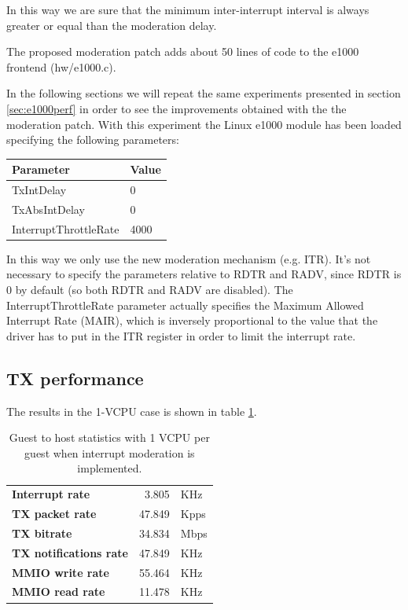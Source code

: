 In this way we are sure that the minimum inter-interrupt interval is always greater or equal than the moderation delay.

\vspace{0.5cm}

The proposed moderation patch adds about 50 lines of code to the e1000 frontend (hw/e1000.c).

\vspace{0.5cm}

In the following sections we will repeat the same experiments presented in section \ref{sec:e1000perf} in order to see the improvements
obtained with the the moderation patch. With this experiment the Linux e1000 module has been loaded specifying the following parameters:
\begin{center}
\begin{tabular}{ll}
\toprule
\textbf{Parameter} & \textbf{Value}\\
\midrule
TxIntDelay & 0\\
TxAbsIntDelay & 0\\
InterruptThrottleRate & 4000\\
\bottomrule
\end{tabular}
\end{center}

In this way we only use the new moderation mechanism (e.g. ITR). It's not necessary to specify the parameters relative to RDTR and
RADV, since RDTR is 0 by default (so both RDTR and RADV are disabled). The InterruptThrottleRate parameter actually specifies the Maximum
Allowed Interrupt Rate (MAIR), which is inversely proportional to the value that the driver has to put in the ITR register in order to limit
the interrupt rate.

\subsection{TX performance}
\label{sec:e1000-mit-tx}
The results in the 1-VCPU case is shown in table \ref{tab:e1000-mit-tx-g2h1vcpu}.

\begin{table}
\begin{center}
\begin{tabular}{lrl}
\toprule
\textbf{Interrupt rate} & 3.805 & KHz\\
\textbf{TX packet rate} & 47.849 & Kpps\\
\textbf{TX bitrate} & 34.834 & Mbps\\
\textbf{TX notifications rate} & 47.849 & KHz\\
\textbf{MMIO write rate} & 55.464 & KHz\\
\textbf{MMIO read rate} & 11.478 & KHz\\
\bottomrule
\end{tabular}
\end{center}
\caption{Guest to host statistics with 1 VCPU per guest when interrupt moderation is implemented.}
\label{tab:e1000-mit-tx-g2h1vcpu}
\end{table}


